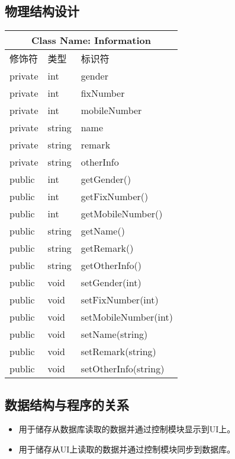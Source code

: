 	\subsection{物理结构设计}
		\begin{tabular}{|l|l|l|}
			\hline
			\multicolumn{3}{|c|}{Class Name: Information} \\
			\hline
			修饰符 & 类型 & 标识符 \\
			\hline
			private & int & gender \\
			private & int & fixNumber \\
			private & int & mobileNumber \\
			private & string & name \\
			private & string & remark \\
			private & string & otherInfo \\
			\hline
			public & int & getGender() \\
			public & int & getFixNumber() \\
			public & int & getMobileNumber() \\
			public & string & getName() \\
			public & string & getRemark() \\
			public & string & getOtherInfo() \\
			public & void & setGender(int) \\
			public & void & setFixNumber(int) \\
			public & void & setMobileNumber(int) \\
			public & void & setName(string) \\
			public & void & setRemark(string) \\
			public & void & setOtherInfo(string) \\
			\hline
		\end{tabular}
	\subsection{数据结构与程序的关系}
		\begin{itemize}
			\item 用于储存从数据库读取的数据并通过控制模块显示到UI上。
			\item 用于储存从UI上读取的数据并通过控制模块同步到数据库。
	\end{itemize}
